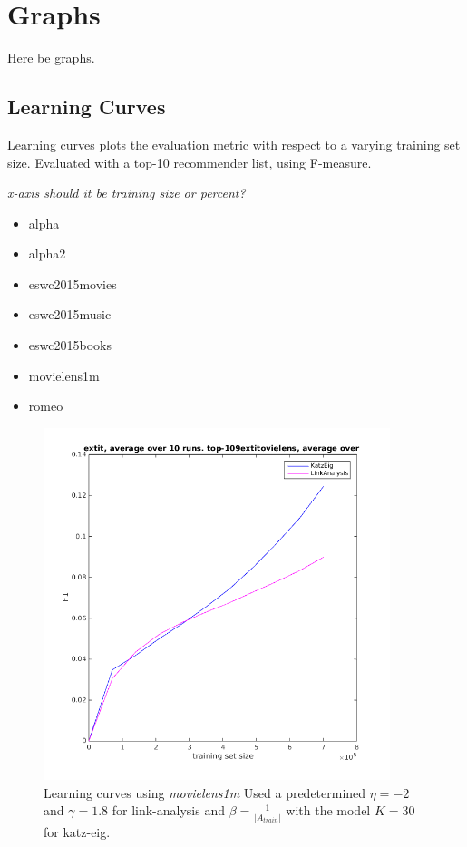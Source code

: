 \chapter{Graphs}\label{cha:graphs}

Here be graphs.

\section{Learning Curves}\label{sec:learning_curves}

Learning curves plots the evaluation metric with respect to a varying training set size. Evaluated with a top-10 recommender list, using F-measure.

\textit{x-axis should it be training size or percent?}

\begin{itemize}
    \item alpha
    \item alpha2
    \item eswc2015movies
    \item eswc2015music
    \item eswc2015books
    \item movielens1m
    \item romeo
\end{itemize}



\begin{figure}[h]
  \centering
    \includegraphics[width=0.9\textwidth]{fig/learning_curves/movielens_learning_curves.png}
    \caption{Learning curves using \textit{movielens1m}
        Used a predetermined $\eta = -2$ and $\gamma = 1.8$ for link-analysis and $\beta = \frac{1}{|A_{train}|}$ with the model $K = 30$ for katz-eig.}
\end{figure}

